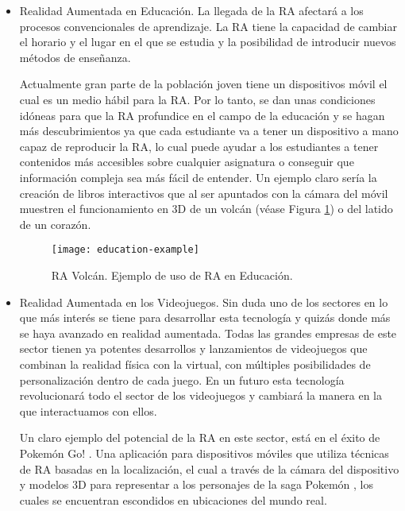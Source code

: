 \begin{itemize}
    \item Realidad Aumentada en Educación. La llegada de la RA afectará a los procesos convencionales de aprendizaje. La RA tiene la capacidad de cambiar el horario y el lugar en el que se estudia y la posibilidad de introducir nuevos métodos de enseñanza. 
    
    Actualmente gran parte de la población joven tiene un dispositivos móvil el cual es un medio hábil para la RA. Por lo tanto, se dan unas condiciones idóneas para que la RA profundice en el campo de la educación y se hagan más descubrimientos ya que cada estudiante va a tener un dispositivo a mano capaz de reproducir la RA, lo cual puede ayudar a los estudiantes a tener contenidos más accesibles sobre cualquier asignatura o conseguir que información compleja sea más fácil de entender. Un ejemplo claro sería la creación de libros interactivos que al ser apuntados con la cámara del móvil muestren el funcionamiento en 3D de un volcán (véase Figura \ref{fig:education-example}) o del latido de un corazón.

    \begin{figure}[h]
        \centering
        \texttt{[image: education-example]}
        \caption{RA Volcán. Ejemplo de uso de RA en Educación. }
        \label{fig:education-example}
    \end{figure}
    
    \item Realidad Aumentada en los Videojuegos. Sin duda uno de los sectores en lo que más interés se tiene para desarrollar esta tecnología y quizás donde más se haya avanzado en realidad aumentada. Todas las grandes empresas de este sector tienen ya potentes desarrollos y lanzamientos de videojuegos que combinan la realidad física con la virtual, con múltiples posibilidades de personalización dentro de cada juego. En un futuro esta tecnología revolucionará todo el sector de los videojuegos y cambiará la manera en la que interactuamos con ellos.   
    
    Un claro ejemplo del potencial de la RA en este sector, está en el éxito de Pokemón Go! \cite{URL::Pokemon-Go}. Una aplicación para dispositivos móviles que utiliza técnicas de RA basadas en la localización, el cual a través de la cámara del dispositivo y modelos 3D para representar a los personajes de la saga Pokemón \cite{URL::Pokemon}, los cuales se encuentran escondidos en ubicaciones del mundo real.  
    

\end{itemize}
